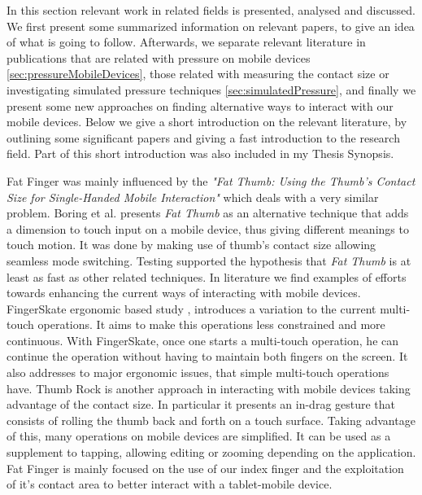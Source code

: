 
In this section relevant work in related fields is presented, analysed and discussed. We first present some summarized information on relevant papers,  to give an idea of what is going to follow. Afterwards, we separate relevant literature in publications that are related with pressure on mobile devices \ref{sec:pressureMobileDevices}, those related with measuring the contact size or investigating simulated pressure techniques \ref{sec:simulatedPressure}, and finally we present some new approaches on finding alternative ways to interact with our mobile devices.
Below we give a short introduction on the relevant literature, by outlining some significant papers and giving a fast introduction to the research field. Part of this short introduction was also included in my Thesis Synopsis.

Fat Finger was mainly influenced by the \emph{"Fat Thumb: Using the Thumb's Contact Size for Single-Handed Mobile Interaction"} \cite{Boring2012} which deals with a very similar problem. Boring et al. presents \emph{Fat Thumb} as an alternative technique that adds a dimension to touch input on a mobile device, thus giving different meanings to touch motion. It was done by making use of thumb's contact size allowing seamless mode switching. Testing supported the hypothesis that \emph{Fat Thumb} is at least as fast as other related techniques.
In literature we find examples of efforts towards enhancing the current ways of interacting with mobile devices.
FingerSkate ergonomic based study \cite{Son:2013:FMM:2508468.2514733}, introduces a variation to the current multi-touch operations. It aims to make this operations less constrained and more continuous. With FingerSkate, once one starts a multi-touch operation, he can continue the operation without having to maintain both fingers on the screen. It also addresses to major ergonomic issues, that simple multi-touch operations have.
Thumb Rock \cite{Bonnet2013} is another approach in interacting with mobile devices taking advantage of the contact size. In particular it presents an in-drag gesture that consists of rolling the thumb back and forth on a touch surface. Taking advantage of this, many operations on mobile devices are simplified. It can be used as a supplement to tapping, allowing editing or zooming depending on the application. 
Fat Finger is mainly focused on the use of our index finger and the exploitation of it's contact area to better interact with a tablet-mobile device.  

